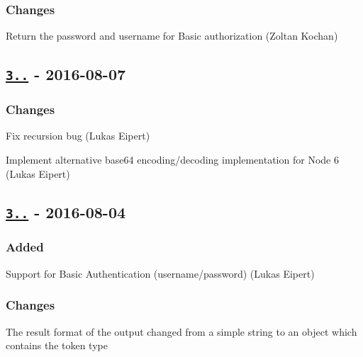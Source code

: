 \subsubsection*{Changes}


\begin{DoxyItemize}
\item Return the password and username for Basic authorization (Zoltan Kochan)
\end{DoxyItemize}

\subsection*{\href{https://github.com/rexxars/registry-auth-token/compare/v3.0.0...v3.0.1}{\tt 3..} -\/ 2016-\/08-\/07}

\subsubsection*{Changes}


\begin{DoxyItemize}
\item Fix recursion bug (Lukas Eipert)
\item Implement alternative base64 encoding/decoding implementation for Node 6 (Lukas Eipert)
\end{DoxyItemize}

\subsection*{\href{https://github.com/rexxars/registry-auth-token/compare/v2.1.1...v3.0.0}{\tt 3..} -\/ 2016-\/08-\/04}

\subsubsection*{Added}


\begin{DoxyItemize}
\item Support for Basic Authentication (username/password) (Lukas Eipert)
\end{DoxyItemize}

\subsubsection*{Changes}


\begin{DoxyItemize}
\item The result format of the output changed from a simple string to an object which contains the token type
\end{DoxyItemize}


